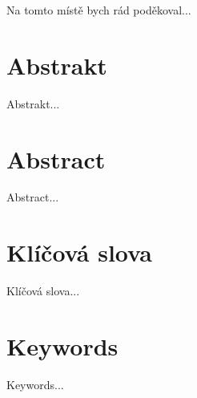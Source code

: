 \documentclass[a4paper,12pt,openany,twoside]{book} %
\begin{document}
\par
\par\vspace*{\fill}

Na tomto místě bych rád poděkoval...

\clearpage

\section*{Abstrakt}
  
Abstrakt...

\section*{Abstract}

Abstract...

\section*{Klíčová slova}

Klíčová slova...

\section*{Keywords}

Keywords...

\clearpage

\tableofcontents

\cleardoublepage
{}






\clearpage

\pagestyle{plain}

\begin{spacing}{1.05}
\printbibliography[title={Seznam použitých zdrojů}]
\end{spacing}


\end{document}
